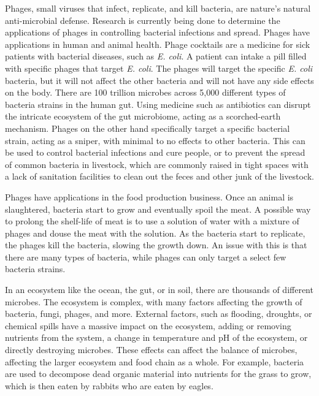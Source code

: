 Phages, small viruses that infect, replicate, and kill bacteria, are nature's natural anti-microbial defense. Research is currently being done to determine the applications of phages in controlling bacterial infections and spread. Phages have applications in human and animal health. Phage cocktails are a medicine for sick patients with bacterial diseases, such as \textit{E. coli}. A patient can intake a pill filled with specific phages that target \textit{E. coli}. The phages will target the specific \textit{E. coli} bacteria, but it will not affect the other bacteria and will not have any side effects on the body. There are 100 trillion microbes across 5,000 different types of bacteria strains in the human gut. Using medicine such as antibiotics can disrupt the intricate ecosystem of the gut microbiome, acting as a scorched-earth mechanism. Phages on the other hand specifically target a specific bacterial strain, acting as a sniper, with minimal to no effects to other bacteria. This can be used to control bacterial infections and cure people, or to prevent the spread of common bacteria in livestock, which are commonly raised in tight spaces with a lack of sanitation facilities to clean out the feces and other junk of the livestock. 

Phages have applications in the food production business. Once an animal is slaughtered, bacteria start to grow and eventually spoil the meat. A possible way to prolong the shelf-life of meat is to use a solution of water with a mixture of phages and douse the meat with the solution. As the bacteria start to replicate, the phages kill the bacteria, slowing the growth down. An issue with this is that there are many types of bacteria, while phages can only target a select few bacteria strains. 

In an ecosystem like the ocean, the gut, or in soil, there are thousands of different microbes. The ecosystem is complex, with many factors affecting the growth of bacteria, fungi,  phages, and more. External factors, such as flooding, droughts, or chemical spills have a massive impact on the ecosystem, adding or removing nutrients from the system, a change in temperature and pH of the ecosystem, or directly destroying microbes. These effects can affect the balance of microbes, affecting the larger ecosystem and food chain as a whole. For example, bacteria are used to decompose dead organic material into nutrients for the grass to grow, which is then eaten by rabbits who are eaten by eagles. 

